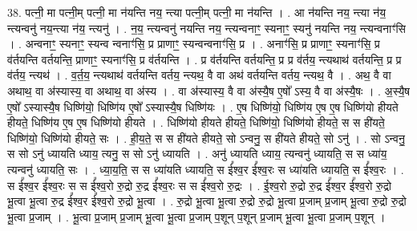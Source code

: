 \documentclass[17pt]{extarticle}
\begin{document}
38. पत्नी॒ मा पत्नी॒म् पत्नी॒ मा न॑यन्ति नय॒ न्त्या पत्नी॒म् पत्नी॒ मा न॑यन्ति । . आ न॑यन्ति नय॒ न्त्या न॑य॒ न्त्यन्वनु॑ नय॒न्त्या न॑य॒ न्त्यनु॑ । . न॒य॒ न्त्यन्वनु॑ नयन्ति नय॒ न्त्यन्वनाꣳ॒॒ स्यनाꣳ॒॒ स्यनु॑ नयन्ति नय॒ न्त्यन्वनाꣳ॑सि । . अन्वनाꣳ॒॒ स्यनाꣳ॒॒ स्यन्व न्वनाꣳ॑सि॒ प्र प्राणाꣳ॒॒ स्यन्वन्वनाꣳ॑सि॒ प्र । . अनाꣳ॑सि॒ प्र प्राणाꣳ॒॒ स्यनाꣳ॑सि॒ प्र व॑र्तयन्ति वर्तयन्ति॒ प्राणाꣳ॒॒ स्यनाꣳ॑सि॒ प्र व॑र्तयन्ति । . प्र व॑र्तयन्ति वर्तयन्ति॒ प्र प्र व॑र्तय॒ न्त्यथाथ॑ वर्तयन्ति॒ प्र प्र व॑र्तय॒ न्त्यथ॑ । . व॒र्त॒य॒ न्त्यथाथ॑ वर्तयन्ति वर्तय॒ न्त्यथ॒ वै वा अथ॑ वर्तयन्ति वर्तय॒ न्त्यथ॒ वै । . अथ॒ वै वा अथाथ॒ वा अ॑स्यास्य॒ वा अथाथ॒ वा अ॑स्य । . वा अ॑स्यास्य॒ वै वा अ॑स्यै॒ष ए॒षो᳚ ऽस्य॒ वै वा अ॑स्यै॒षः । . अ॒स्यै॒ष ए॒षो᳚ ऽस्यास्यै॒ष धिष्णि॑यो॒ धिष्णि॑य ए॒षो᳚ ऽस्यास्यै॒ष धिष्णि॑यः । . ए॒ष धिष्णि॑यो॒ धिष्णि॑य ए॒ष ए॒ष धिष्णि॑यो हीयते हीयते॒ धिष्णि॑य ए॒ष ए॒ष धिष्णि॑यो हीयते । . धिष्णि॑यो हीयते हीयते॒ धिष्णि॑यो॒ धिष्णि॑यो हीयते॒ स स ही॑यते॒ धिष्णि॑यो॒ धिष्णि॑यो हीयते॒ सः । . ही॒य॒ते॒ स स ही॑यते हीयते॒ सो ऽन्वनु॒ स ही॑यते हीयते॒ सो ऽनु॑ । . सो ऽन्वनु॒ स सो ऽनु॑ ध्यायति ध्याय॒ त्यनु॒ स सो ऽनु॑ ध्यायति । . अनु॑ ध्यायति ध्याय॒ त्यन्वनु॑ ध्यायति॒ स स ध्या॑य॒ त्यन्वनु॑ ध्यायति॒ सः । . ध्या॒य॒ति॒ स स ध्या॑यति ध्यायति॒ स ई᳚श्व॒र ई᳚श्व॒रः स ध्या॑यति ध्यायति॒ स ई᳚श्व॒रः । . स ई᳚श्व॒र ई᳚श्व॒रः स स ई᳚श्व॒रो रु॒द्रो रु॒द्र ई᳚श्व॒रः स स ई᳚श्व॒रो रु॒द्रः । . ई॒श्व॒रो रु॒द्रो रु॒द्र ई᳚श्व॒र ई᳚श्व॒रो रु॒द्रो भू॒त्वा भू॒त्वा रु॒द्र ई᳚श्व॒र ई᳚श्व॒रो रु॒द्रो भू॒त्वा । . रु॒द्रो भू॒त्वा भू॒त्वा रु॒द्रो रु॒द्रो भू॒त्वा प्र॒जाम् प्र॒जाम् भू॒त्वा रु॒द्रो रु॒द्रो भू॒त्वा प्र॒जाम् । . भू॒त्वा प्र॒जाम् प्र॒जाम् भू॒त्वा भू॒त्वा प्र॒जाम् प॒शून् प॒शून् प्र॒जाम् भू॒त्वा भू॒त्वा प्र॒जाम् प॒शून् । \newline
\pagebreak
{}
\end{document}
